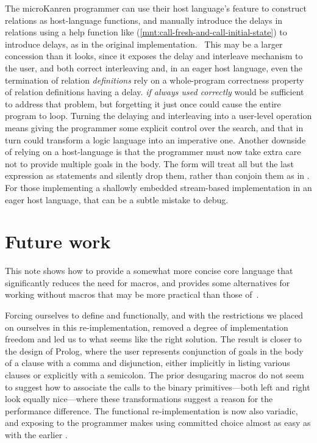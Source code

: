 \documentclass[sigplan,balance=true,pbalance=true,natbib=false]{acmart}
\begin{document}
The microKanren programmer can use their host language's
 feature to construct relations as host-language
functions, and manually introduce the delays in relations using a help
function like 
(\cref{mnt:call-fresh-and-call-initial-state}) to introduce delays, as
in the original implementation.~\cite{hemann2013muKanren} This may be
a larger concession than it looks, since it exposes the delay and
interleave mechanism to the user, and both correct interleaving and,
in an eager host language, even the termination of relation
\emph{definitions} rely on a whole-program correctness property of
relation definitions having a delay.  \emph{if always
  used correctly} would be sufficient to address that problem, but
forgetting it just once could cause the entire program to loop.
Turning the delaying and interleaving into a user-level operation
means giving the programmer some explicit control over the search, and
that in turn could transform a logic language into an imperative one.
Another downside of relying on a host-language  is
that the programmer must now take extra care not to provide multiple
goals in the body. The  form will treat all but the
last expression as statements and silently drop them, rather than
conjoin them as in . For those implementing a
shallowly embedded stream-based implementation in an eager host
language, that can be a subtle mistake to debug.

\section{Future work}\label{sec:conclusion}

This note shows how to provide a somewhat more concise core language
that significantly reduces the need for macros, and provides some
alternatives for working without macros that may be more practical
than those of~\citet{hemann2013muKanren}.

Forcing ourselves to define  and 
functionally, and with the restrictions we placed on ourselves in this
re-implementation, removed a degree of implementation freedom and led
us to what seems like the right solution. The result is closer to the
design of Prolog, where the user represents conjunction of goals in
the body of a clause with a comma and disjunction, either implicitly
in listing various clauses or explicitly with a semicolon. The prior
desugaring macros do not seem to suggest how to associate the calls to
the binary primitives---both left and right look equally nice---where
these transformations suggest a reason for the performance difference.
The functional  re-implementation is now also
variadic, and exposing  to the programmer makes using
committed choice almost as easy as with the
earlier .
\end{document}
